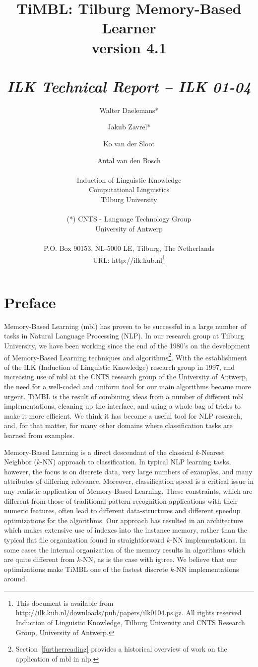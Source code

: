\documentclass{report}
\author{Walter Daelemans* \and Jakub Zavrel* \and Ko van der Sloot \and
	Antal van den Bosch\\ \ \\
	Induction of Linguistic Knowledge\\
	Computational Linguistics\\ 
        Tilburg University \\ \\
	(*) CNTS - Language Technology Group\\
	University of Antwerp\\ \\
        P.O. Box 90153, NL-5000 LE, Tilburg, The Netherlands \\ 
        URL: http://ilk.kub.nl\thanks{This document is available from
	http://ilk.kub.nl/downloads/pub/papers/ilk0104.ps.gz. All rights reserved
	Induction of Linguistic Knowledge, Tilburg University and 
        CNTS Research Group, University of Antwerp.}}
\title{{\huge TiMBL: Tilburg Memory-Based Learner} \\ \vspace*{0.5cm}
{\bf version 4.1} \\ \vspace*{0.5cm}{\huge Reference Guide}\\
\vspace*{1cm} {\it ILK Technical Report -- ILK 01-04}}
\begin{document}

\maketitle

\tableofcontents

\chapter*{Preface}

Memory-Based Learning ({\sc mbl}) has proven to be successful in a
large number of tasks in Natural Language Processing (NLP). In our
research group at Tilburg University, we have been working since the
end of the 1980's on the development of Memory-Based Learning
techniques and algorithms\footnote{Section~\ref{furtherreading}
provides a historical overview of work on the application of {\sc
mbl} in {\sc nlp}.}. With the establishment of the ILK (Induction of
Linguistic Knowledge) research group in 1997, and increasing use of
{\sc mbl} at the CNTS research group of the University of Antwerp, the
need for a well-coded and uniform tool for our main algorithms became
more urgent. TiMBL is the result of combining ideas from a number of
different {\sc mbl} implementations, cleaning up the interface, and
using a whole bag of tricks to make it more efficient. We think it has
become a useful tool for NLP research, and, for that matter, for many
other domains where classification tasks are learned from examples.

Memory-Based Learning is a direct descendant of the classical
$k$-Nearest Neighbor ($k$-NN) approach to classification. In typical
NLP learning tasks, however, the focus is on discrete data, very large
numbers of examples, and many attributes of differing
relevance. Moreover, classification speed is a critical issue in any
realistic application of Memory-Based Learning. These constraints,
which are different from those of traditional pattern
recognition applications with their numeric features, often lead to
different data-structures and different speedup optimizations for the
algorithms. Our approach has resulted in an architecture which makes
extensive use of indexes into the instance memory, rather than the
typical flat file organization found in straightforward $k$-NN
implementations. In some cases the internal organization of the memory
results in algorithms which are quite different from $k$-NN, as is the
case with {\sc igtree}. We believe that our optimizations make TiMBL
one of the fastest discrete $k$-NN implementations around.
\end{document}
